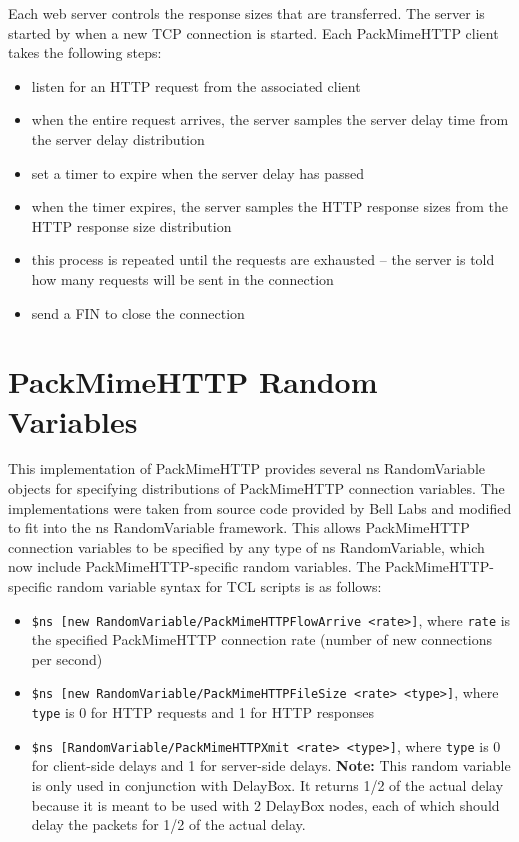 Each web server controls the response sizes that are transferred. The
server is started by when a new TCP connection is started. Each
PackMimeHTTP client takes the following steps: 
\begin{itemize}
\item{listen for an HTTP request from the associated client}
\item{when the entire request arrives, the server samples the server
delay time from the server delay distribution} 
\item{set a timer to expire when the server delay has passed}
\item{when the timer expires, the server samples the HTTP response
sizes from the HTTP response size distribution} 
\item{this process is repeated until the requests are exhausted -- the
server is told how many requests will be sent in the connection} 
\item{send a FIN to close the connection}
\end{itemize}

\section{PackMimeHTTP Random Variables}

This implementation of PackMimeHTTP provides several ns RandomVariable
objects for specifying distributions of PackMimeHTTP connection
variables. The implementations were taken from source code provided by
Bell Labs and modified to fit into the ns RandomVariable
framework. This allows PackMimeHTTP connection variables to be
specified by any type of ns RandomVariable, which now include
PackMimeHTTP-specific random variables. The PackMimeHTTP-specific
random variable syntax for TCL scripts is as follows: 
\begin{itemize}
\item{{\tt \$ns [new RandomVariable/PackMimeHTTPFlowArrive <rate>]},
where {\tt rate} is the specified PackMimeHTTP connection rate (number  
of new connections per second)}
\item{{\tt \$ns [new RandomVariable/PackMimeHTTPFileSize <rate> <type>]},
where {\tt type} is 0 for HTTP requests and 1 for HTTP responses} 
\item{{\tt \$ns [RandomVariable/PackMimeHTTPXmit <rate> <type>]}, where
{\tt type} is 0 for client-side delays and 1 for
server-side delays.  \textbf{Note:} This random variable
is only used in conjunction with DelayBox.  It returns 1/2 of the actual delay because it is meant to be used with 2 DelayBox nodes, each of which should delay the packets for 1/2 of the actual delay.}
\end{itemize}

